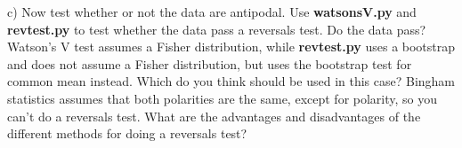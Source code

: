 {c) Now test whether or not  the data are antipodal.    Use {\bf watsonsV.py} and {\bf revtest.py} to test whether the data pass a reversals test.    Do the data pass?  
Watson's V test assumes a Fisher distribution, while {\bf revtest.py} uses a bootstrap and does not assume a Fisher distribution, but uses the bootstrap test for common mean instead.   Which do you think should be used in this case?    Bingham statistics assumes that both polarities are the same, except for polarity, so you can't do a reversals test.   What are the advantages and disadvantages of the different methods for doing a reversals test? 

}
